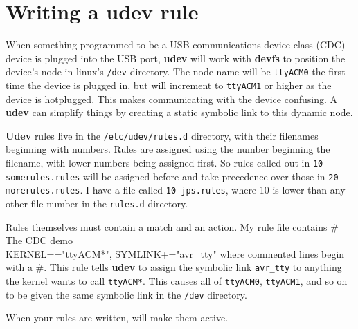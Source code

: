 \section{Writing a udev rule}
When something programmed to be a USB communications device class
(CDC) device is plugged into the USB port, \textbf{udev}
will work with \textbf{devfs} to position the device's node in linux's
\texttt{/dev} directory\footnotemark{}.  The node name will be
\texttt{ttyACM0} the first time the device is plugged in, but will
increment to \texttt{ttyACM1} or higher as the device is hotplugged.
This makes communicating with the device confusing.  A \textbf{udev}
can simplify things by creating a static symbolic link to this dynamic
node.


\textbf{Udev} rules live in the \texttt{/etc/udev/rules.d} directory,
with their filenames beginning with numbers.  Rules are assigned using
the number beginning the filename, with lower numbers being assigned
first.  So rules called out in \texttt{10-somerules.rules} will be
assigned before and take precedence over those in
\texttt{20-morerules.rules}.  I have a file called
\texttt{10-jps.rules}, where 10 is lower than any other file number in
the \texttt{rules.d} directory.

Rules themselves must contain a match and an action.  My rule file
contains
{
    \# The CDC demo\\
    KERNEL=="ttyACM*", SYMLINK+="avr\_tty"
}
where commented lines begin with a \#.  This rule tells \textbf{udev}
to assign the symbolic link \texttt{avr\_tty} to anything the kernel
wants to call \texttt{ttyACM*}.  This causes all of \texttt{ttyACM0},
\texttt{ttyACM1}, and so on to be given the same symbolic link in the
\texttt{/dev} directory.

When your rules are written,
will make them active.

